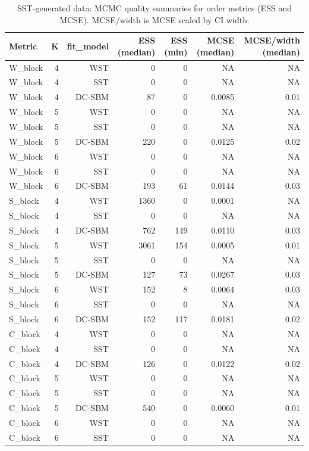 \begin{table}[!h]
\centering
\caption{SST-generated data: MCMC quality summaries for order metrics (ESS and MCSE). MCSE/width is MCSE scaled by CI width.\\\label{tab:sst-appx-mcmc-quality}}
\centering
\begin{tabular}[t]{lrrrrrr}
\toprule
Metric & K & fit_model & ESS (median) & ESS (min) & MCSE (median) & MCSE/width (median)\\
\midrule
W_block & 4 & WST & 0 & 0 & NA & NA\\
W_block & 4 & SST & 0 & 0 & NA & NA\\
W_block & 4 & DC-SBM & 87 & 0 & 0.0085 & 0.01\\
W_block & 5 & WST & 0 & 0 & NA & NA\\
W_block & 5 & SST & 0 & 0 & NA & NA\\
W_block & 5 & DC-SBM & 220 & 0 & 0.0125 & 0.02\\
W_block & 6 & WST & 0 & 0 & NA & NA\\
W_block & 6 & SST & 0 & 0 & NA & NA\\
W_block & 6 & DC-SBM & 193 & 61 & 0.0144 & 0.03\\
S_block & 4 & WST & 1360 & 0 & 0.0001 & NA\\
S_block & 4 & SST & 0 & 0 & NA & NA\\
S_block & 4 & DC-SBM & 762 & 149 & 0.0110 & 0.03\\
S_block & 5 & WST & 3061 & 154 & 0.0005 & 0.01\\
S_block & 5 & SST & 0 & 0 & NA & NA\\
S_block & 5 & DC-SBM & 127 & 73 & 0.0267 & 0.03\\
S_block & 6 & WST & 152 & 8 & 0.0064 & 0.03\\
S_block & 6 & SST & 0 & 0 & NA & NA\\
S_block & 6 & DC-SBM & 152 & 117 & 0.0181 & 0.02\\
C_block & 4 & WST & 0 & 0 & NA & NA\\
C_block & 4 & SST & 0 & 0 & NA & NA\\
C_block & 4 & DC-SBM & 126 & 0 & 0.0122 & 0.02\\
C_block & 5 & WST & 0 & 0 & NA & NA\\
C_block & 5 & SST & 0 & 0 & NA & NA\\
C_block & 5 & DC-SBM & 540 & 0 & 0.0060 & 0.01\\
C_block & 6 & WST & 0 & 0 & NA & NA\\
C_block & 6 & SST & 0 & 0 & NA & NA\\

\end{tabular}
\end{table}
